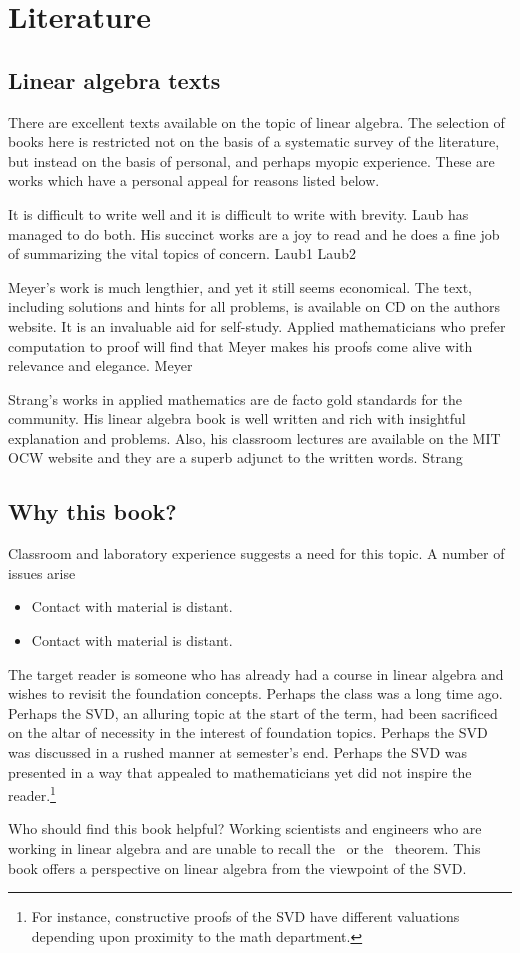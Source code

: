 \chapter*{Literature}

\section*{Linear algebra texts}
There are excellent texts available on the topic of linear algebra. The selection of books here is restricted not on the basis of a systematic survey of the literature, but instead on the basis of personal, and perhaps myopic experience. These are works which have a personal appeal for reasons listed below. 

It is difficult to write well and it is difficult to write with brevity. Laub has managed to do both. His succinct works are a joy to read and he does a fine job of summarizing the vital topics of concern. 
Laub1
Laub2

Meyer's work is much lengthier, and yet it still seems economical. The text, including solutions and hints for all problems, is available on CD on the authors website. It is an invaluable aid for self-study. Applied mathematicians who prefer computation to proof will find that Meyer makes his proofs come alive with relevance and elegance.
Meyer

Strang's works in applied mathematics are de facto gold standards for the community. His linear algebra book is well written and rich with insightful explanation and problems. Also, his classroom lectures are available on the MIT OCW website and they are a superb adjunct to the written words.
Strang 


\section*{Why this book?}
Classroom and laboratory experience suggests a need for this topic. A number of issues arise
\begin{itemize}
\item Contact with material is distant.
\item Contact with material is distant.
\end{itemize}

The target reader is someone who has already had a course in linear algebra and wishes to revisit the foundation concepts. Perhaps the class was a long time ago. Perhaps the SVD, an alluring topic at the start of the term, had been sacrificed on the altar of necessity in the interest of foundation topics. Perhaps the SVD was discussed in a rushed manner at semester's end. Perhaps the SVD was presented in a way that appealed to mathematicians yet did not inspire the reader.\footnote{For instance, constructive proofs of the SVD have different valuations depending upon proximity to the math department.}

Who should find this book helpful? Working scientists and engineers who are working in linear algebra and are unable to recall the \ftola \ or the \asvd \ theorem. This book offers a perspective on linear algebra from the viewpoint of the SVD.





\endinput